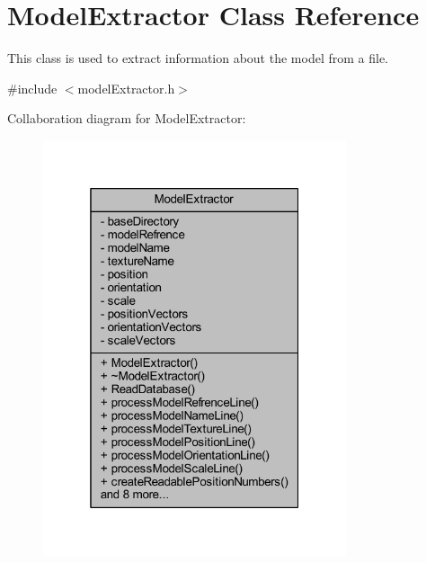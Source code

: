 \hypertarget{class_model_extractor}{}\section{Model\+Extractor Class Reference}
\label{class_model_extractor}


This class is used to extract information about the model from a file.  




{\ttfamily \#include $<$model\+Extractor.\+h$>$}



Collaboration diagram for Model\+Extractor\+:\nopagebreak
\begin{figure}[H]
\begin{center}
\leavevmode
\includegraphics[width=253pt]{class_model_extractor__coll__graph}
\end{center}
\end{figure}

